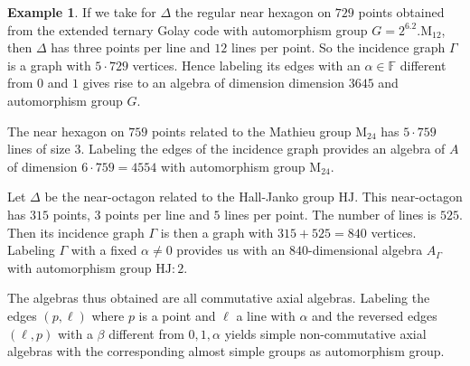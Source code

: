 \documentclass[oneside,a4paper]{amsart} %
\theoremstyle{definition}
\newtheorem{example}[proposition]{Example}
\begin{document}
\begin{example}
If we take for $\Delta$ the regular near hexagon on $729$ points obtained from the extended ternary Golay code with automorphism group 
$G=2^6.2.\mathrm{M}_{12}$, then $\Delta$ has three points per line and $12$ lines per point.
So the incidence graph $\Gamma$ is a graph with $5\cdot 729$ vertices.
Hence labeling its edges with an $\alpha\in \mathbb{F}$ different from $0$ and $1$ gives rise to an algebra of dimension
dimension $3645$ and automorphism group $G$.


The near hexagon on $759$ points related to the Mathieu group $\mathrm{M}_{24}$ has $5\cdot 759$ lines of size $3$.
Labeling the edges of the incidence graph provides an algebra of $A$ of dimension $6\cdot 759=4554$ with automorphism group  $\mathrm{M}_{24}$.


Let $\Delta$ be the near-octagon related to the Hall-Janko group $\mathrm{HJ}$. This near-octagon has $315$ points, $3$ points per line and $5$ lines per point. The number of lines is $525$.
Then its incidence graph $\Gamma$ is then a graph with $315+525=840$ vertices.
Labeling $\Gamma$ with a fixed $\alpha\neq 0$ provides us with an $840$-dimensional algebra $A_\Gamma$ with automorphism group $\mathrm{HJ}:2$.

The algebras thus obtained are all commutative axial algebras.
Labeling the edges $(p,\ell)$ where $p$ is a point and $\ell$ a line with $\alpha$ and the reversed edges $(\ell,p)$ with a $\beta$ different from $0,1,\alpha$ yields
simple non-commutative axial algebras with the corresponding almost simple groups as automorphism group.
\end{example}
\end{document}
